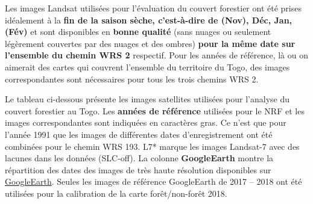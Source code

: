 \documentclass[a4paper, notitlepage, 12pt, krantz2]{krantz}
\begin{document}
Les images Landsat utilisées pour l'évaluation du couvert forestier ont été prises idéalement à la \textbf{fin de la saison sèche, c'est-à-dire de (Nov), Déc, Jan, (Fév)} et sont disponibles en \textbf{bonne qualité} (sans nuages ou seulement légèrement couvertes par des nuages et des ombres) \textbf{pour la même date sur l'ensemble du chemin WRS 2} respectif. Pour les années de référence, là ou on aimerait des cartes qui couvrent l'ensemble du territoire du Togo, des images correspondantes sont nécessaires pour tous les trois chemins WRS 2.

Le tableau ci-dessous présente les images satellites utilisées pour l'analyse du couvert forestier au Togo. Les \textbf{années de référence} utilisées pour le NRF et les images correspondantes sont indiquées en caractères gras. Ce n'est que pour l'année 1991 que les images de différentes dates d'enregistrement ont été combinées pour le chemin WRS 193. L7* marque les images Landsat-7 avec des lacunes dans les données (SLC-off). La colonne \textbf{GoogleEarth} montre la répartition des dates des images de très haute résolution disponibles sur \href{https://www.google.com/maps/place/Togo/@6.8865979,0.6126023,1079m/data=!3m1!1e3!4m5!3m4!1s0x1023e1c113185419:0xfaae5b301ad19360!8m2!3d8.619543!4d0.824782}{GoogleEarth}. Seules les images de référence GoogleEarth de 2017 -- 2018 ont été utilisées pour la calibration de la carte forêt/non-forêt 2018.
\end{document}
